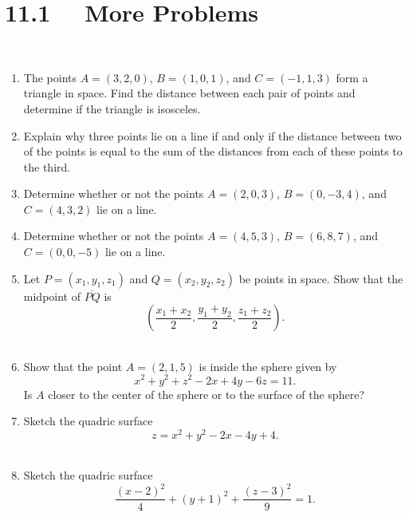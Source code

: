 \section*{11.1 \ \ More Problems}

\ 


\begin{enumerate}
\item  The points $A = (3, 2, 0)$, $B = (1, 0, 1)$, and $C = (-1, 1, 3)$ form a triangle in space.  Find the distance between each pair of points and determine if the triangle is isosceles. \\ %

\item  Explain why three points lie on a line if and only if the distance between two of the points is equal to the sum of the distances from each of these points to the third. \\ %

\item  Determine whether or not the points $A = (2, 0, 3)$, $B = (0, -3, 4)$, and $C = (4, 3, 2)$ lie on a line. \\ %

\item  Determine whether or not the points $A = (4, 5, 3)$, $B = (6, 8, 7)$, and $C = (0, 0, -5)$ lie on a line. \\ %

\item  Let $P = (x_1, y_1, z_1)$ and $Q = (x_2, y_2, z_2)$ be points in space.  Show that the midpoint of $\overline{PQ}$ is 
\[
\left( \frac{x_1 + x_2}{2}, \frac{y_1 + y_2}{2}, \frac{z_1 + z_2}{2} \right).
\] \\ %

\item  Show that the point $A = (2, 1, 5)$ is inside the sphere given by 
\[
x^2 + y^2 + z^2 - 2x + 4y - 6z = 11.
\]
Is $A$ closer to the center of the sphere or to the surface of the sphere? \\ %

\item  Sketch the quadric surface 
\[
z = x^2 + y^2 - 2x - 4y + 4.
\] \\  %

\item  Sketch the quadric surface 
\[
\frac{(x - 2)^2}{4} + (y + 1)^2 + \frac{(z - 3)^2}{9} = 1.
\] \\ %
\end{enumerate}